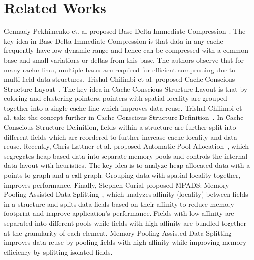 \section{Related Works}
\label{sec:rel}

Gennady Pekhimenko et. al proposed Base-Delta-Immediate Compression~\cite{bdi}. The key
idea in Base-Delta-Immediate Compression is that data in any cache frequently
have low dynamic range and hence can be compressed with a common base and small
variations or deltas from this base. The authors observe that for many cache
lines, multiple bases are required for efficient compressing due to multi-field
data structures. Trishul Chilimbi et al. proposed Cache-Conscious Structure
Layout~\cite{cache-layout}. The key idea in Cache-Conscious Structure Layout is that by coloring
and clustering pointers, pointers with spatial locality are grouped together
into a single cache line which improves data reuse. Trishul Chilimbi et al. take
the concept further in Cache-Conscious Structure Definition~\cite{cache-def}. In
Cache-Conscious Structure Definition, fields within a structure are further
split into different fields which are reordered to further increase cache
locality and data reuse. Recently, Chris Lattner et al. proposed Automatic Pool
Allocation~\cite{lattner1}, which segregates heap-based data into separate memory pools and
controls the internal data layout with heuristics. The key idea is to analyze
heap allocated data with a points-to graph and a call graph. Grouping data with
spatial locality together, improves performance. Finally, Stephen Curial
proposed MPADS: Memory-Pooling-Assisted Data Splitting~\cite{mpads}, which analyzes
affinity (locality) between fields in a structure and splits data fields based
on their affinity to reduce memory footprint and improve application’s
performance. Fields with low affinity are separated into different pools while
fields with high affinity are bundled together at the granularity of each
element. Memory-Pooling-Assisted Data Splitting improves data reuse by pooling
fields with high affinity while improving memory efficiency by splitting
isolated fields.
